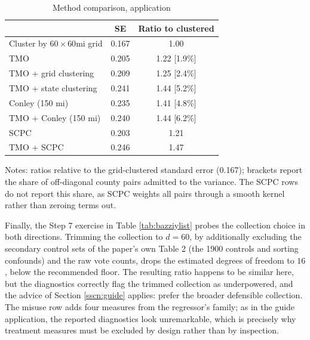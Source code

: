 \documentclass[varwidth,bib]{statapress}
\begin{document}
\begin{stlog}

\end{stlog}

\begin{table}[H]
\centering
\caption{Method comparison, \citet{Bazzietal2023} application}
\label{tab:bazzicompare}
\begin{threeparttable}
\begin{tabular}{lcc}
\toprule
 & SE & Ratio to clustered \\
\midrule
Cluster by $60\times 60$mi grid   & 0.167 & 1.00          \\
TMO                               & 0.205 & 1.22 [1.9\%]  \\
TMO + grid clustering             & 0.209 & 1.25 [2.4\%]  \\
TMO + state clustering            & 0.241 & 1.44 [5.2\%]  \\
Conley (150 mi)                   & 0.235 & 1.41 [4.8\%]  \\
TMO + Conley (150 mi)             & 0.240 & 1.44 [6.2\%]  \\
SCPC                              & 0.203 & 1.21          \\
TMO + SCPC                        & 0.246 & 1.47          \\
\bottomrule
\end{tabular}
\begin{tablenotes}[flushleft]
\setlength{}\scriptsize
\item Notes: ratios relative to the grid-clustered standard error (0.167); brackets report the share of off-diagonal county pairs admitted to the variance.  The SCPC rows do not report this share, as SCPC weights all pairs through a smooth kernel rather than zeroing terms out.
\end{tablenotes}
\end{threeparttable}
\end{table}

Finally, the Step 7 exercise in Table \ref{tab:bazziylist} probes the collection choice in both directions.  Trimming the collection to $d=60$, by additionally excluding the secondary control sets of the paper's own Table 2 (the 1900 controls and sorting confounds) and the raw vote counts, drops the estimated degrees of freedom to $16$, below the recommended floor.  The resulting ratio happens to be similar here, but the diagnostics correctly flag the trimmed collection as underpowered, and the advice of Section \ref{sscn:guide} applies: prefer the broader defensible collection.  The misuse row adds four measures from the regressor's family; as in the guide application, the reported diagnostics look unremarkable, which is precisely why treatment measures must be excluded by design rather than by inspection.
\end{document}
